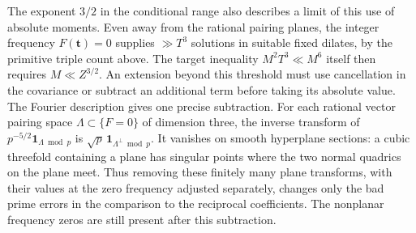 \documentclass[11pt,letterpaper]{article}
\theoremstyle{definition}
\begin{document}
The exponent $3/2$ in the conditional range also describes a
limit of this use of absolute moments. Even away from the rational
pairing planes, the integer frequency $F(\mathbf t)=0$ supplies
$\gg T^3$ solutions in suitable fixed dilates, by the primitive
triple count above. The target inequality
$M^2T^3\ll M^6$ itself then requires $M\ll Z^{3/2}$.
An extension beyond this threshold must use cancellation in the
covariance or subtract an additional term before taking its
absolute value. The Fourier description gives one precise
subtraction. For each rational vector pairing space
$\Lambda\subset\{F=0\}$ of dimension three, the inverse transform
of $p^{-5/2}\mathbf1_{\Lambda\bmod p}$ is
$\sqrt p\,\mathbf1_{\Lambda^\perp\bmod p}$.
It vanishes on smooth hyperplane sections: a cubic threefold
containing a plane has singular points where the two normal
quadrics on the plane meet. Thus removing these finitely many
plane transforms, with their values at the zero frequency adjusted
separately, changes only the bad prime errors in the comparison
to the reciprocal coefficients. The nonplanar frequency zeros
are still present after this subtraction.
\end{document}
